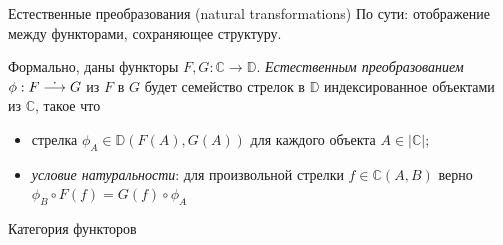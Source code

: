 \documentclass[
  russian,
  aspectratio=169,
  xcolor={svgnames},
  hyperref={colorlinks,citecolor=DeepPink4}]{beamer}
\begin{document}
\begin{frame}[fragile]{Естественные преобразования (natural transformations)}
По сути: отображение между функторами, сохраняющее структуру.\vspace{0.4cm}

Формально, даны функторы $F,G : \mathbb{C} \rightarrow \mathbb{D}$. \textit{Естественным преобразованием}
$\phi : F \overset{\text{\normalsize .}}\longrightarrow G$ из $F$ в $G$ будет
семейство стрелок в $\mathbb{D}$ индексированное объектами из $\mathbb{C}$, такое что
\begin{itemize}
 \item стрелка $\phi_{A} \in \mathbb{D}(F(A), G(A))$ для каждого объекта
 $A \in |\mathbb{C}|$;
 \item \textit{условие натуральности}: для произвольной стрелки $f \in \mathbb{C}(A, B)$ верно $\phi_{B} \circ F(f)=G(f) \circ \phi_{A}$
\end{itemize}

\end{frame}

\begin{frame}[fragile]{Категория функторов}
\end{frame}
\end{document}
